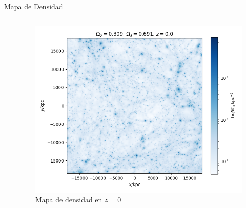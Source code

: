 \documentclass{beamer}
\begin{document}
\begin{frame}{Mapa de Densidad}
\begin{columns}[t]
\begin{column}{0.33\textwidth}
		\end{column}	

		\begin{column}{0.33\textwidth}
			
			\begin{figure}
				\includegraphics[scale=0.2]{RunCanonica/RunCanonZ0Rho.png}
				\caption{\footnotesize Mapa de densidad en $z=0$}
			\end{figure}

		\end{column}		
		
	\end{columns}
\end{frame}




\end{document}
